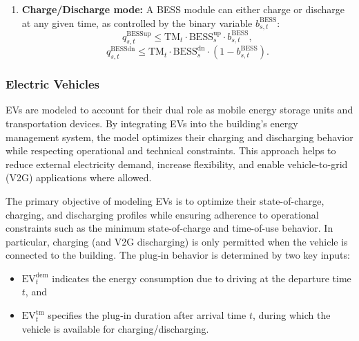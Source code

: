 \documentclass[11pt]{article}
\begin{document}
\begin{enumerate}
    \item \textbf{Charge/Discharge mode:}
    A BESS module can either charge or discharge at any given time, as controlled by the binary variable \(b^\text{BESS}_{s,t}\):
    \[
    q^\text{BESSup}_{s,t} \leq \text{TM}_t \cdot \text{BESS}^\text{up}_s \cdot b^\text{BESS}_{s,t},
    \]
    \[
    q^\text{BESSdn}_{s,t} \leq  \text{TM}_t \cdot \text{BESS}^\text{dn}_s \cdot (1 - b^\text{BESS}_{s,t}).
    \]
    
\end{enumerate}

\subsubsection{Electric Vehicles}
\label{sec:ev}

EVs are modeled to account for their dual role as mobile energy storage units and transportation devices. By integrating EVs into the building's energy management system, the model optimizes their charging and discharging behavior while respecting operational and technical constraints. This approach helps to reduce external electricity demand, increase flexibility, and enable vehicle-to-grid (V2G) applications where allowed.

The primary objective of modeling EVs is to optimize their state-of-charge, charging, and discharging profiles while ensuring adherence to operational constraints such as the minimum state-of-charge and time-of-use behavior. In particular, charging (and V2G discharging) is only permitted when the vehicle is connected to the building. The plug‐in behavior is determined by two key inputs: 
\begin{itemize}
    \item \(\text{EV}^\text{dem}_t\) indicates the energy consumption due to driving at the departure time \(t\), and 
    \item \(\text{EV}^\text{tm}_t\) specifies the plug‐in duration after arrival time \(t\), during which the vehicle is available for charging/discharging.
\end{itemize}
\end{document}
